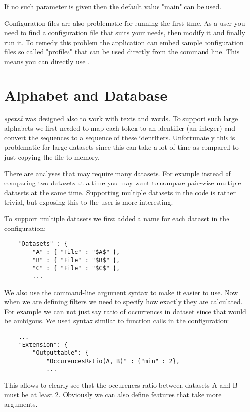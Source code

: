If no such parameter is given then the default value "main" can be used.

Configuration files are also problematic for running the first time. As a user you need to find a configuration file that suits your needs, then modify it and finally run it. To remedy this problem the application can embed sample configuration files so called "profiles" that can be used directly from the command line. This means you can directly use .

\section{Alphabet and Database}

\emph{spexs2} was designed also to work with texts and words. To support such large alphabets we first needed to map each token to an identifier (an integer) and convert the sequences to a sequence of these identifiers. Unfortunately this is problematic for large datasets since this can take a lot of time as compared to just copying the file to memory.

There are analyses that may require many datasets. For example instead of comparing two datasets at a time you may want to compare pair-wise multiple datasets at the same time. Supporting multiple datasets in the code is rather trivial, but exposing this to the user is more interesting.

To support multiple datasets we first added a name for each dataset in the configuration:

\begin{lstlisting}
    "Datasets" : {
        "A" : { "File" : "$A$" },
        "B" : { "File" : "$B$" },
        "C" : { "File" : "$C$" },
        ...
\end{lstlisting}

We also use the command-line argument syntax to make it easier to use. Now when we are defining filters we need to specify how exactly they are calculated. For example we can not just say ratio of occurrences in dataset since that would be ambigous. We used syntax similar to function calls in the configuration:

\begin{lstlisting}
    ...
    "Extension": {
        "Outputtable": {
            "OccurencesRatio(A, B)" : {"min" : 2},
            ...
\end{lstlisting}

This allows to clearly see that the occurences ratio between datasets A and B must be at least 2. Obviously we can also define features that take more arguments.

